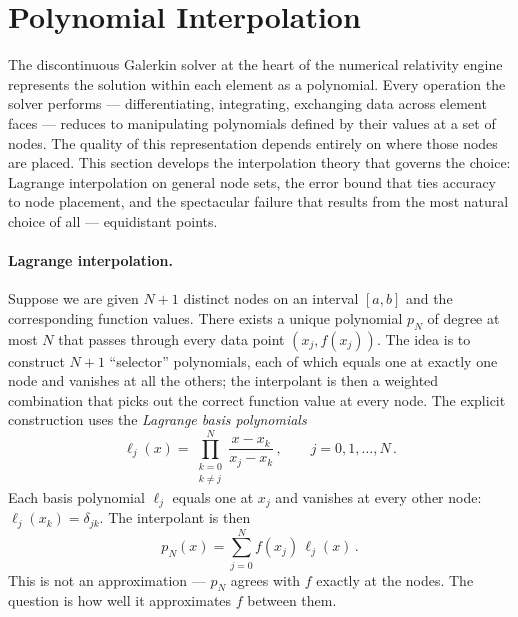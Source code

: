 \section{Polynomial Interpolation}
\label{sec:spec-interpolation}

The discontinuous Galerkin solver at the heart of the numerical
relativity engine represents the solution within each element as a
polynomial.  Every operation the solver performs --- differentiating,
integrating, exchanging data across element faces --- reduces to
manipulating polynomials defined by their values at a set of nodes.
The quality of this representation depends entirely on where those
nodes are placed.  This section develops the interpolation theory that
governs the choice: Lagrange interpolation on general node sets, the
error bound that ties accuracy to node placement, and the spectacular
failure that results from the most natural choice of all ---
equidistant points.

\paragraph{Lagrange interpolation.}

Suppose we are given $N + 1$ distinct
nodes on an interval $[a, b]$ and the corresponding function values.
There exists a unique polynomial $p_N$ of degree at most $N$ that
passes through every data point $(x_j, f(x_j))$.  The idea is to construct $N + 1$ ``selector'' polynomials,
each of which equals one at exactly one node and vanishes at all the
others; the interpolant is then a weighted combination that picks out
the correct function value at every node.  The explicit construction
uses the \emph{Lagrange basis polynomials}
%
\begin{equation}
  \ell_j(x)
    = \prod_{\substack{k=0 \\ k \neq j}}^{N}
      \frac{x - x_k}{x_j - x_k} \,,
  \qquad j = 0, 1, \ldots, N \,.
  \label{eq:lagrange-basis}
\end{equation}
%
Each basis polynomial $\ell_j$ equals one at $x_j$ and vanishes at
every other node: $\ell_j(x_k) = \delta_{jk}$.  The interpolant is
then
%
\begin{equation}
  p_N(x)
    = \sum_{j=0}^{N} f(x_j)\,\ell_j(x) \,.
  \label{eq:lagrange-interp}
\end{equation}
%
This is not an approximation --- $p_N$ agrees with $f$ exactly at the
nodes.  The question is how well it approximates $f$ between them.

